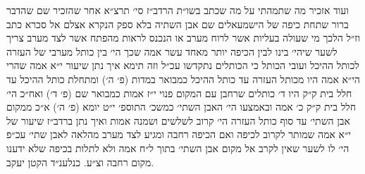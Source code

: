 \documentclass[12pt, openany]{book}
\begin{document}
\begin{multicols}{2}
ועוד אזכיר מה שתמהתי על מה שכתב בשו״ת הרדב״ז סי׳ תרצ״א אחר שהזכיר שם שהדבר ברור שתחת כיפה של הישמעאלים שם אבן השתיה בלא ספק הנקרא אצלם אל סכרא כתב וז״ל הלכך מי שעולה בעליות אשר לרוח מערב או הנכנס לראות מהפתח אשר לצד מערב צריך לשער שיהי׳ בינו לבין הכיפה יותר מאחד עשר אמה שכך הי׳ בין כותל מערבי של העזרה לכותל ההיכל ועובי הכותל כי הכותלים נתקדשו עכ״ל וזה תימא איך נתן שיעור י״א אמה שהרי הי״א אמה היו מכותל העזרה עד כותל ההיכל כמבואר במדות (פ׳ ה׳) ומתחלת כותל ההיכל עד חלל בית ק״ק היו ד׳ כותלים שרחבן עם המקום פנוי י״ז אמות כמבואר שם (פ׳ ד׳) ואח״כ הי׳ חלל בית ק״ק כ׳ אמה ובאמצעו הי׳ האבן השתי׳ כמשכ׳ התוספ׳ י״ט יומא (פ׳ ה׳) א״כ ממקום אבן השתי׳ עד סוף כותל העזרה הי׳ קרוב לשלשים ושמנה אמות ואיך נתן ברדב״ז שיעור של י״א אמה שמותר לקרוב לכיפה ואם הכיפה רחבה ומגיע לצד מערב מהלאה לאבן שתי׳ עכ״פ הי׳ לו לשער שאין לקרב אל מקום אבן השתי׳ בתוך ל״ח אמה ולא לתלות בכיפה שלא ידענו מקום רחבה וצ״ע. כנלענ״ד הקטן יעקב.\\\vspace{0pt}

\end{multicols}\newpage
\end{document}
